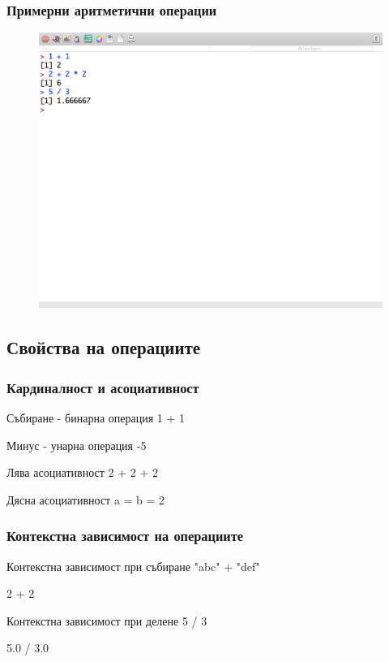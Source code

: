 \documentclass{beamer}
\begin{document}
\begin{frame}
\frametitle{Примерни аритметични операции}
\begin{figure}[]\includegraphics[width=\textwidth,height=0.75\textheight]{pic0020}\end{figure}
\end{frame}

\subsection{Свойства на операциите}

\begin{frame}
\frametitle{Кардиналност и асоциативност}
\begin{block}{Събиране - бинарна операция}
1 + 1
\end{block}
\begin{block}{Минус - унарна операция}
-5
\end{block}
\begin{block}{Лява асоциативност}
2 + 2 + 2
\end{block}
\begin{block}{Дясна асоциативност}
a = b = 2
\end{block}
\end{frame}

\begin{frame}
\frametitle{Контекстна зависимост на операциите}
\begin{block}{Контекстна зависимост при събиране}
"abc" + "def"

2 + 2
\end{block}
\begin{block}{Контекстна зависимост при делене}
5 / 3

5.0 / 3.0
\end{block}
\end{frame}
\end{document}
